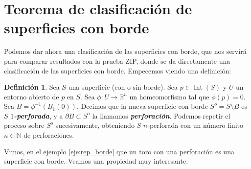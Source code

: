 \documentclass[10pt]{report}
\newcommand{\R}{\mathbb{R}}
\newcommand{\N}{\mathbb{N}}
\DeclareMathOperator{\interior}{Int} %
\newcommand{\enfatiza}[1]{\textbf{\textit{#1}}}
\theoremstyle{definition}
\newtheorem{defin}{Definición}[section]
\begin{document}
\section{Teorema de clasificación de superficies con borde}
Podemos dar ahora una clasificación de las superficies con borde, que nos servirá para comparar resultados con la prueba ZIP, donde se da directamente una clasificación de las superficies con borde.
Empecemos viendo una definición:
\begin{defin}%
\label{def:perforacion}
Sea $S$ una superficie (con o sin borde). Sea $p\in \interior (S)$ y $U$ un entorno abierto de $p$ en $S$. Sea $\phi :U\to \R^n$ un homeomorfismo tal que $\phi (p)=0$. Sea $B=\phi ^{-1}(B_1(0))$. Decimos que la nueva superficie con borde $S^o=S\setminus B$ es $S$ \enfatiza{$1$-perforada}, y a $\partial B\subset S^o$ la llamamos \enfatiza{perforación}. Podemos repetir el proceso sobre $S^o$ sucesivamente, obteniendo $S$ $n$-perforada con un número finito $n\in \N$ de perforaciones.
\end{defin}

Vimos, en el ejemplo \autoref{eje:rep_borde} que un toro con una perforación es una superficie con borde. Veamos una propiedad muy interesante:
\end{document}
